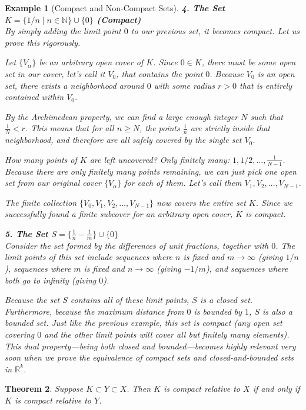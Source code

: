 \documentclass{article}
\theoremstyle{mythm}
\newtheorem{theorem}{Theorem}[section]
\newtheorem{example}[theorem]{Example}
\begin{document}
\begin{example}[Compact and Non-Compact Sets]
\textbf{4. The Set $K = \{1/n \mid n \in \mathbb{N}\} \cup \{0\}$ (Compact)} \\
By simply adding the limit point $0$ to our previous set, it becomes compact. Let us prove this rigorously. 

Let $\{V_\alpha\}$ be an arbitrary open cover of $K$. Since $0 \in K$, there must be some open set in our cover, let's call it $V_0$, that contains the point $0$. Because $V_0$ is an open set, there exists a neighborhood around $0$ with some radius $r > 0$ that is entirely contained within $V_0$.

By the Archimedean property, we can find a large enough integer $N$ such that $\frac{1}{N} < r$. This means that for all $n \ge N$, the points $\frac{1}{n}$ are strictly inside that neighborhood, and therefore are all safely covered by the single set $V_0$.

How many points of $K$ are left uncovered? Only finitely many: $1, 1/2, \dots, \frac{1}{N-1}$. Because there are only finitely many points remaining, we can just pick one open set from our original cover $\{V_\alpha\}$ for each of them. Let's call them $V_1, V_2, \dots, V_{N-1}$. 

The finite collection $\{V_0, V_1, V_2, \dots, V_{N-1}\}$ now covers the entire set $K$. Since we successfully found a finite subcover for an arbitrary open cover, $K$ is compact.

\textbf{5. The Set $S = \{\frac{1}{n} - \frac{1}{m}\} \cup \{0\}$} \\
Consider the set formed by the differences of unit fractions, together with $0$. The limit points of this set include sequences where $n$ is fixed and $m \to \infty$ (giving $1/n$), sequences where $m$ is fixed and $n \to \infty$ (giving $-1/m$), and sequences where both go to infinity (giving $0$). 

Because the set $S$ contains all of these limit points, $S$ is a \textit{closed} set. Furthermore, because the maximum distance from $0$ is bounded by $1$, $S$ is also a \textit{bounded} set. Just like the previous example, this set is compact (any open set covering $0$ and the other limit points will cover all but finitely many elements). This dual property—being both closed and bounded—becomes highly relevant very soon when we prove the equivalence of compact sets and closed-and-bounded sets in $\mathbb{R}^k$.
\end{example}
\begin{theorem}
Suppose $K \subset Y \subset X$. Then $K$ is compact relative to $X$ if and only if $K$ is compact relative to $Y$.
\end{theorem}
\end{document}
